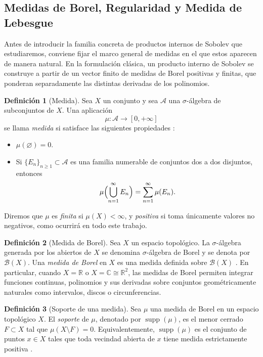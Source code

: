 \documentclass[12pt,a4paper]{article}
\theoremstyle{definition}
\newtheorem{definition}{Definición}
\theoremstyle{remark}
\begin{document}
\subsection{Medidas de Borel, Regularidad y Medida de Lebesgue}

Antes de introducir la familia concreta de productos internos de Sobolev que estudiaremos, conviene fijar el marco general de medidas en el que estos aparecen de manera natural. En la formulación clásica, un producto interno de Sobolev se construye a partir de un vector finito de medidas de Borel positivas y finitas, que ponderan separadamente las distintas derivadas de los polinomios.

\begin{definition}[Medida]
	Sea $X$ un conjunto y sea $\mathcal{A}$ una $\sigma$-álgebra de subconjuntos de $X$. Una aplicación
	\[
		\mu : \mathcal{A} \to [0,+\infty]
	\]
	se llama \emph{medida} si satisface las siguientes propiedades \cite{folland1999real,rudin1987real}:
	\begin{itemize}
		\item $\mu(\varnothing)=0$.
		\item Si $\{E_n\}_{n\geq 1} \subset \mathcal{A}$ es una familia numerable de conjuntos dos a dos disjuntos, entonces
		      \[
			      \mu\Bigl(\bigcup_{n=1}^{\infty} E_n\Bigr)=\sum_{n=1}^{\infty}\mu(E_n).
		      \]
	\end{itemize}
	Diremos que $\mu$ es \emph{finita} si $\mu(X)<\infty$, y \emph{positiva} si toma únicamente valores no negativos, como ocurrirá en todo este trabajo.
\end{definition}

\begin{definition}[Medida de Borel]
	Sea $X$ un espacio topológico. La $\sigma$-álgebra generada por los abiertos de $X$ se denomina $\sigma$-álgebra de Borel y se denota por $\mathcal{B}(X)$. Una \emph{medida de Borel} en $X$ es una medida definida sobre $\mathcal{B}(X)$ \cite{folland1999real,bogachev2007measure}. En particular, cuando $X=\mathbb{R}$ o $X=\mathbb{C}\cong\mathbb{R}^2$, las medidas de Borel permiten integrar funciones continuas, polinomios y sus derivadas sobre conjuntos geométricamente naturales como intervalos, discos o circunferencias.
\end{definition}

\begin{definition}[Soporte de una medida]
	Sea $\mu$ una medida de Borel en un espacio topológico $X$. El \emph{soporte} de $\mu$, denotado por $\operatorname{supp}(\mu)$, es el menor cerrado $F \subset X$ tal que $\mu(X\setminus F)=0$. Equivalentemente, $\operatorname{supp}(\mu)$ es el conjunto de puntos $x \in X$ tales que toda vecindad abierta de $x$ tiene medida estrictamente positiva \cite{folland1999real,bogachev2007measure}.
\end{definition}
\end{document}
